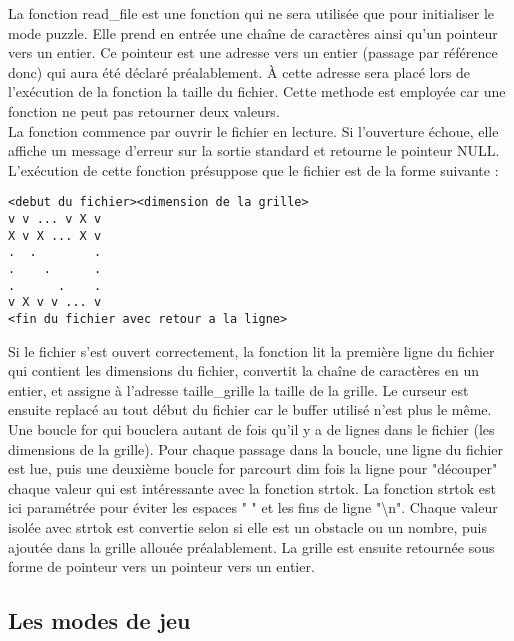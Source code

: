 \documentclass[12pt]{article}
\begin{document}
\indent La fonction read\_file est une fonction qui ne sera utilisée que pour initialiser le mode puzzle. Elle prend en entrée une chaîne de caractères ainsi qu'un pointeur vers un entier. Ce pointeur est une adresse vers un entier (passage par référence donc) qui aura été déclaré préalablement. À cette adresse sera placé lors de l'exécution de la fonction la taille du fichier. Cette methode est employée car une fonction ne peut pas retourner deux valeurs.\\
La fonction commence par ouvrir le fichier en lecture. Si l'ouverture échoue, elle affiche un message d'erreur sur la sortie standard et retourne le pointeur NULL.
L'exécution de cette fonction présuppose que le fichier est de la forme suivante :
\begin{lstlisting}[style=mystyle, caption={fichier de la grille}]
<debut du fichier><dimension de la grille>
v v ... v X v
X v X ... X v
.  .        .
.    .      .
.      .    .
v X v v ... v
<fin du fichier avec retour a la ligne>
\end{lstlisting}



Si le fichier s'est ouvert correctement, la fonction lit la première ligne du fichier qui contient les dimensions du fichier, convertit la chaîne de caractères en un entier, et assigne à l'adresse taille\_grille la taille de la grille. Le curseur est ensuite replacé au tout début du fichier car le buffer utilisé n'est plus le même. Une boucle for qui bouclera autant de fois qu'il y a de lignes dans le fichier (les dimensions de la grille). Pour chaque passage dans la boucle, une ligne du fichier est lue, puis une deuxième boucle for parcourt dim fois la ligne pour "découper" chaque valeur qui est intéressante avec la fonction strtok. La fonction strtok est ici paramétrée pour éviter les espaces " " et les fins de ligne "\textbackslash n". Chaque valeur isolée avec strtok est convertie selon si elle est un obstacle ou un nombre, puis ajoutée dans la grille allouée préalablement. La grille est ensuite retournée sous forme de pointeur vers un pointeur vers un entier.

\subsection{Les modes de jeu}
\end{document}
